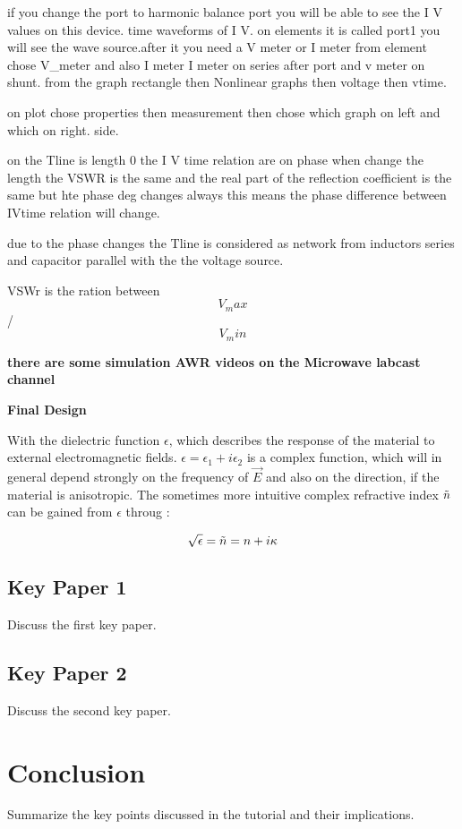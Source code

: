\documentclass{article}
\begin{document}
if you change the port to harmonic balance port you will be able to see the 
I V values on this device. time waveforms  of I V.
on elements it is called port1
you will see the wave source.after it you need a V meter or I meter 
from element chose V_meter and also I meter 
I meter on series after port and v meter on shunt.
from the graph rectangle then Nonlinear graphs then voltage then vtime.

on plot chose properties then measurement then  chose which graph on left and which on right. side.

on the Tline is length 0  the I V time relation are on phase when change the length the VSWR is the same and the 
real part of the reflection coefficient is the same  but hte phase deg changes always
this means the phase difference between IVtime relation will change.

due to the phase changes the Tline is considered as network from inductors series and capacitor parallel
with the the voltage source.

VSWr is the ration between $$V_max$$ / $$V_min$$





\textbf{there are some simulation AWR videos on the Microwave labcast channel}


\textbf{Final Design}
\











With the dielectric function $\epsilon$, which describes the response of the material to external electromagnetic fields. $\epsilon = \epsilon_1 + i \epsilon_2$ is a complex function, which will in general depend strongly on the frequency of $\Vec{E}$ and also on the direction, if the material is anisotropic. The sometimes more intuitive complex refractive index $\Tilde{n}$ can be gained from $\epsilon$ throug \cite{paper_2}:

\begin{equation}
    \sqrt{\epsilon} = \Tilde{n} = n + i\kappa
\end{equation}














\subsection{Key Paper 1}
Discuss the first key paper. \cite{author2021paper}

\subsection{Key Paper 2}
Discuss the second key paper. \cite{author2022paper}



\section{Conclusion}
Summarize the key points discussed in the tutorial and their implications.



\end{document}
